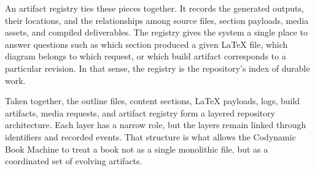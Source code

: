 An artifact registry ties these pieces together. It records the generated outputs, their locations, and the relationships among source files, section payloads, media assets, and compiled deliverables. The registry gives the system a single place to answer questions such as which section produced a given \LaTeX{} file, which diagram belongs to which request, or which build artifact corresponds to a particular revision. In that sense, the registry is the repository's index of durable work.

Taken together, the outline files, content sections, \LaTeX{} payloads, logs, build artifacts, media requests, and artifact registry form a layered repository architecture. Each layer has a narrow role, but the layers remain linked through identifiers and recorded events. That structure is what allows the Codynamic Book Machine to treat a book not as a single monolithic file, but as a coordinated set of evolving artifacts.
